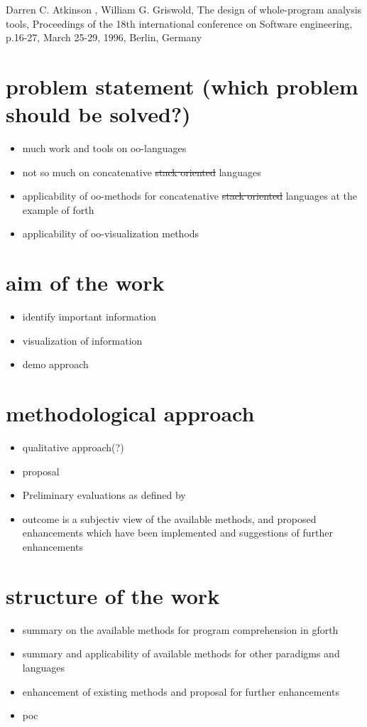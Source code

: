 Darren C. Atkinson , William G. Griswold, The design of whole-program analysis tools, Proceedings of the 18th international conference on Software engineering, p.16-27, March 25-29, 1996, Berlin, Germany\\

\section{problem statement (which problem should be solved?)}

\begin{itemize}
\item much work and tools on oo-languages
\item not so much on concatenative \sout{stack oriented} languages
\item applicability of oo-methods for concatenative \sout{stack oriented} languages at the example of forth
\item applicability of oo-visualization methods
\end{itemize}

\section{aim of the work}

\begin{itemize}
\item identify important information
\item visualization of information
\item demo approach
\end{itemize}

\section{methodological approach}

\begin{itemize}
\item qualitative approach(?)
\item proposal
\item Preliminary evaluations as defined by \cite{Cornelissen:2009:SSP:1638616.1639301}
\item outcome is a subjectiv view of the available methods, and proposed enhancements which have been implemented and suggestions of further enhancements
\end{itemize}

\section{structure of the work}

\begin{itemize}
\item summary on the available methods for program comprehension in gforth
\item summary and applicability of available methods for other paradigms and languages
\item enhancement of existing methods and proposal for further enhancements
\item poc
\end{itemize}